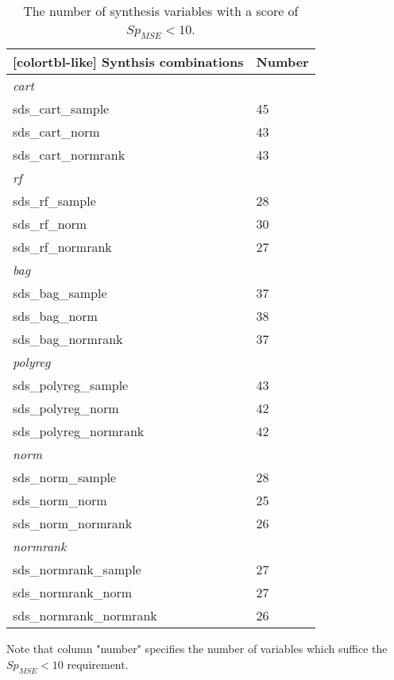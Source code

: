 \begin{table}[h]
    \centering
    \caption{The number of synthesis variables with a score of $Sp_{MSE}<10$.}
    \begin{NiceTabular}{@{}ll@{}}[colortbl-like]\hline 
         Synthsis combinations & Number\\\hline
         \textit{cart} & \\
         sds\_cart\_sample & 45\\
         sds\_cart\_norm & 43\\
         sds\_cart\_normrank & 43\\\hline
         \textit{rf} & \\
         sds\_rf\_sample & 28\\
         sds\_rf\_norm & 30\\
         sds\_rf\_normrank & 27\\\hline
         \textit{bag} & \\
         sds\_bag\_sample & 37\\
         sds\_bag\_norm & 38\\
         sds\_bag\_normrank & 37\\\hline
         \textit{polyreg} & \\
         sds\_polyreg\_sample & 43\\
         sds\_polyreg\_norm & 42\\
         sds\_polyreg\_normrank & 42\\\hline
         \textit{norm} & \\
         sds\_norm\_sample & 28\\
         sds\_norm\_norm & 25\\
         sds\_norm\_normrank & 26\\\hline
         \textit{normrank} & \\
         sds\_normrank\_sample & 27\\
         sds\_normrank\_norm & 27\\
         sds\_normrank\_normrank & 26\\\hline
    \end{NiceTabular}
    {\parbox{6in}{
    \footnotesize Note that column "number" specifies the number of variables which suffice the $Sp_{MSE}<10$ requirement.}
    }
    \label{tab:spmse}

\end{table}

